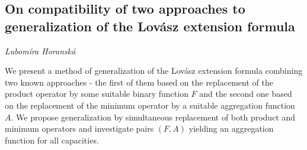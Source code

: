 \documentclass[../booklet.tex]{subfiles}
\begin{document}
\subsection[On compatibility of two approaches to generalization of the Lovász extension formula. {\it Lubomíra Horanská}]{On compatibility of two approaches to generalization of the Lovász extension formula}

\begin{center}
  {\it Lubomíra Horanská}
\end{center}



We present a method of generalization of the Lov\'asz extension formula combining two known approaches - the first of them based on the replacement of the product operator by some suitable binary function $F$ and the second one based on the replacement of the minimum operator by a suitable aggregation function $A$. We propose generalization by simultaneous replacement of both product and minimum operators and investigate pairs $(F,A)$ yielding an aggregation function for all capacities. 
\end{document}
